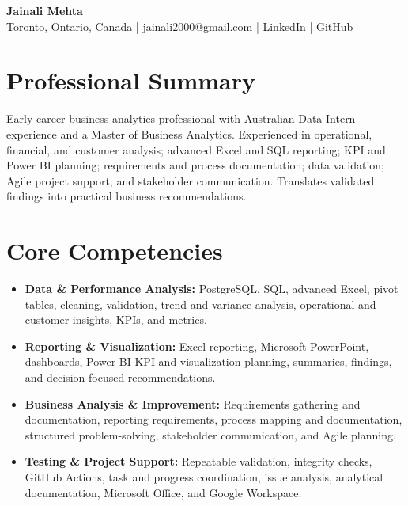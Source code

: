 \documentclass[letterpaper,10pt]{article}
\begin{document}
\begin{center}
  {\fontsize{17}{19}\selectfont\textbf{Jainali Mehta}}\\[2pt]
  \small Toronto, Ontario, Canada \;|\;
  \href{mailto:jainali2000@gmail.com}{jainali2000@gmail.com} \;|\;
  \href{https://www.linkedin.com/in/jainali-mehta}{LinkedIn} \;|\;
  \href{https://github.com/jainalimehta}{GitHub}
\end{center}
\vspace{-7pt}

\section{Professional Summary}
\small Early-career business analytics professional with Australian Data Intern experience and a Master of Business Analytics. Experienced in operational, financial, and customer analysis; advanced Excel and SQL reporting; KPI and Power BI planning; requirements and process documentation; data validation; Agile project support; and stakeholder communication. Translates validated findings into practical business recommendations.

\section{Core Competencies}
\begin{itemize}[leftmargin=0.16in,label=\textbullet,topsep=0pt,itemsep=1pt,parsep=0pt]
  \item \small \textbf{Data \& Performance Analysis:} PostgreSQL, SQL, advanced Excel, pivot tables, cleaning, validation, trend and variance analysis, operational and customer insights, KPIs, and metrics.
  \item \small \textbf{Reporting \& Visualization:} Excel reporting, Microsoft PowerPoint, dashboards, Power BI KPI and visualization planning, summaries, findings, and decision-focused recommendations.
  \item \small \textbf{Business Analysis \& Improvement:} Requirements gathering and documentation, reporting requirements, process mapping and documentation, structured problem-solving, stakeholder communication, and Agile planning.
  \item \small \textbf{Testing \& Project Support:} Repeatable validation, integrity checks, GitHub Actions, task and progress coordination, issue analysis, analytical documentation, Microsoft Office, and Google Workspace.
\end{itemize}
\end{document}
